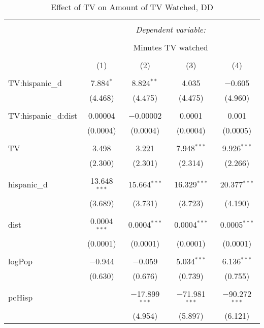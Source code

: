
\begin{table}[!htbp] \centering 
  \caption{Effect of TV on Amount of TV Watched, DD} 
  \label{} 
\begin{tabular}{@{\extracolsep{-5pt}}lcccc} 
\\[-1.8ex]\hline 
\hline \\[-1.8ex] 
 & \multicolumn{4}{c}{\textit{Dependent variable:}} \\ 
\cline{2-5} 
\\[-1.8ex] & \multicolumn{4}{c}{Minutes TV watched} \\ 
\\[-1.8ex] & (1) & (2) & (3) & (4)\\ 
\hline \\[-1.8ex] 
 TV:hispanic\_d & 7.884$^{*}$ & 8.824$^{**}$ & 4.035 & $-$0.605 \\ 
  & (4.468) & (4.475) & (4.475) & (4.960) \\ 
  & & & & \\ 
 TV:hispanic\_d:dist & 0.00004 & $-$0.00002 & 0.0001 & 0.001 \\ 
  & (0.0004) & (0.0004) & (0.0004) & (0.0005) \\ 
  & & & & \\ 
 TV & 3.498 & 3.221 & 7.948$^{***}$ & 9.926$^{***}$ \\ 
  & (2.300) & (2.301) & (2.314) & (2.266) \\ 
  & & & & \\ 
 hispanic\_d & 13.648$^{***}$ & 15.664$^{***}$ & 16.329$^{***}$ & 20.377$^{***}$ \\ 
  & (3.689) & (3.731) & (3.723) & (4.190) \\ 
  & & & & \\ 
 dist & 0.0004$^{***}$ & 0.0004$^{***}$ & 0.0004$^{***}$ & 0.0005$^{***}$ \\ 
  & (0.0001) & (0.0001) & (0.0001) & (0.0001) \\ 
  & & & & \\ 
 logPop & $-$0.944 & $-$0.059 & 5.034$^{***}$ & 6.136$^{***}$ \\ 
  & (0.630) & (0.676) & (0.739) & (0.755) \\ 
  & & & & \\ 
 pcHisp &  & $-$17.899$^{***}$ & $-$71.981$^{***}$ & $-$90.272$^{***}$ \\ 
  &  & (4.954) & (5.897) & (6.121) \\ 

\end{tabular}
\end{table}
